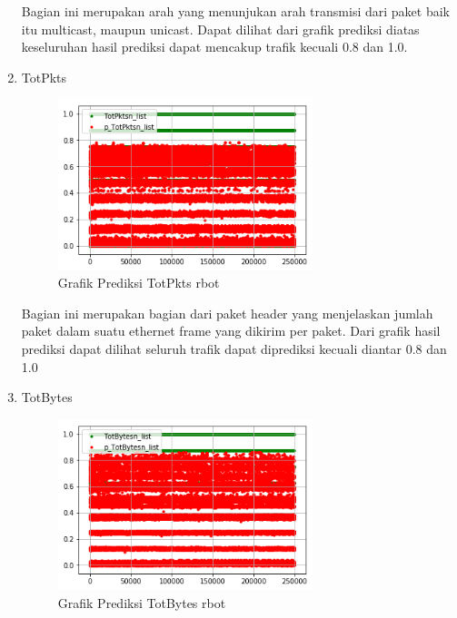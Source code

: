 \documentclass[./skripsi.tex]{subfiles}
\begin{document}
\begin{enumerate}
    \par Bagian ini merupakan arah yang menunjukan arah transmisi dari paket baik itu multicast, maupun unicast. Dapat dilihat dari grafik prediksi diatas keseluruhan hasil prediksi dapat mencakup trafik kecuali 0.8 dan 1.0.
    
    \item TotPkts
    \begin{figure}%
        \centering
        \includegraphics[width=0.7\textwidth]{public/assets/img/lstmm_rbot_pred7.png}
        \caption{Grafik Prediksi TotPkts rbot}
        \label{fig:lstmm_rbot_pred7}
    \end{figure}
    
    \par Bagian ini merupakan bagian dari paket header yang menjelaskan jumlah paket dalam suatu ethernet frame yang dikirim per paket. Dari grafik hasil prediksi dapat dilihat seluruh trafik dapat diprediksi kecuali diantar 0.8 dan 1.0
    
    \item TotBytes
    \begin{figure}%
        \centering
        \includegraphics[width=0.7\textwidth]{public/assets/img/lstmm_rbot_pred8.png}
        \caption{Grafik Prediksi TotBytes rbot}
        \label{fig:lstmm_rbot_pred8}
    \end{figure}
    

\end{enumerate}
\end{document}
